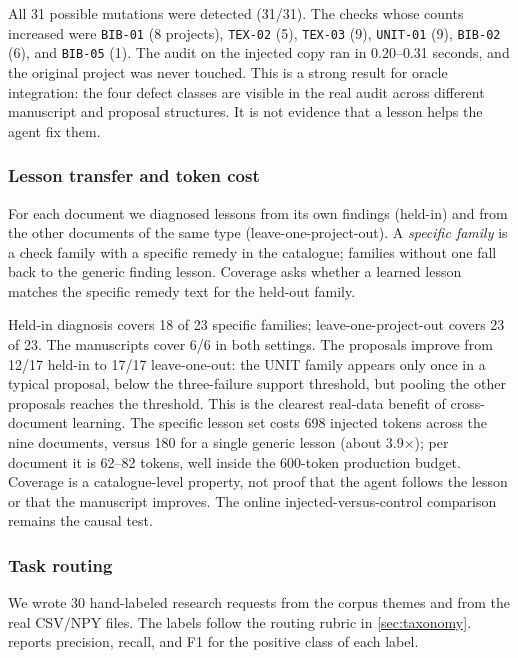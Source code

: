 

All 31 possible mutations were detected (31/31). The checks whose counts increased were \texttt{BIB-01} (8 projects), \texttt{TEX-02} (5), \texttt{TEX-03} (9), \texttt{UNIT-01} (9), \texttt{BIB-02} (6), and \texttt{BIB-05} (1). The audit on the injected copy ran in 0.20--0.31 seconds, and the original project was never touched. This is a strong result for oracle integration: the four defect classes are visible in the real audit across different manuscript and proposal structures. It is not evidence that a lesson helps the agent fix them.

\subsubsection{Lesson transfer and token cost}
\label{sec:transfer-exp}
For each document we diagnosed lessons from its own findings (held-in) and from the other documents of the same type (leave-one-project-out). A \emph{specific family} is a check family with a specific remedy in the catalogue; families without one fall back to the generic finding lesson. Coverage asks whether a learned lesson matches the specific remedy text for the held-out family.



Held-in diagnosis covers 18 of 23 specific families; leave-one-project-out covers 23 of 23. The manuscripts cover 6/6 in both settings. The proposals improve from 12/17 held-in to 17/17 leave-one-out: the UNIT family appears only once in a typical proposal, below the three-failure support threshold, but pooling the other proposals reaches the threshold. This is the clearest real-data benefit of cross-document learning. The specific lesson set costs 698 injected tokens across the nine documents, versus 180 for a single generic lesson (about 3.9$\times$); per document it is 62--82 tokens, well inside the 600-token production budget. Coverage is a catalogue-level property, not proof that the agent follows the lesson or that the manuscript improves. The online injected-versus-control comparison remains the causal test.

\subsubsection{Task routing}
\label{sec:routing-exp}
We wrote 30 hand-labeled research requests from the corpus themes and from the real CSV/NPY files. The labels follow the routing rubric in \cref{sec:taxonomy}.  reports precision, recall, and F1 for the positive class of each label.

